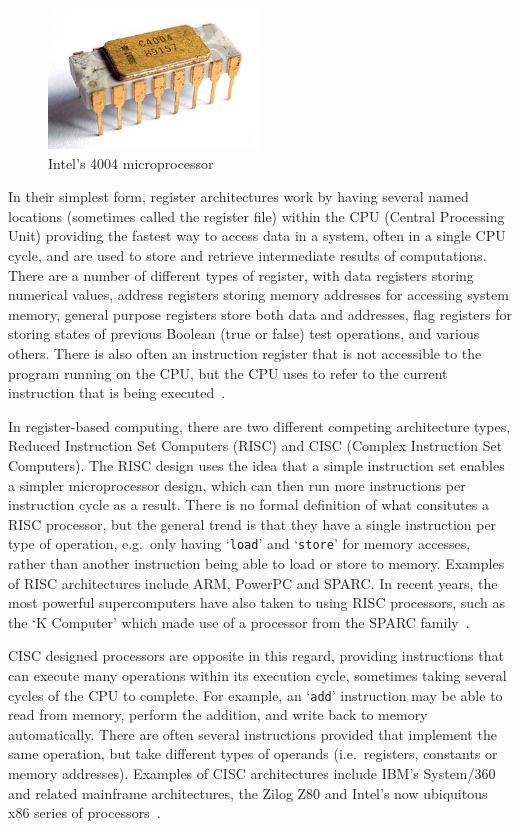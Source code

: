 \begin{figure}
  \includegraphics[width=0.5\textwidth]{imgs/Intel_C4004}
  \caption{Intel's 4004 microprocessor}\label{fig:4004}
\end{figure}

In their simplest form, register architectures work by having several named
locations (sometimes called the register file) within the CPU (Central
Processing Unit) providing the fastest way to access data in a system, often in
a single CPU cycle, and are used to store and retrieve intermediate results of
computations. There are a number of different types of register, with data
registers storing numerical values, address registers storing memory addresses
for accessing system memory, general purpose registers store both data and
addresses, flag registers for storing states of previous Boolean (true or false)
test operations, and various others. There is also often an instruction
register that is not accessible to the program running on the CPU, but the CPU
uses to refer to the current instruction that is being
executed~\cite{Mittal2016RegisterFile}\cite{Patterson2011Computer}.

In register-based computing, there are two different competing architecture
types, Reduced Instruction Set Computers (RISC) and CISC (Complex Instruction
Set Computers). The RISC design uses the idea that a simple instruction set
enables a simpler microprocessor design, which can then run more instructions
per instruction cycle as a result. There is no formal definition of what
consitutes a RISC processor, but the general trend is that they have a single
instruction per type of operation, e.g.\ only having `\texttt{load}' and
`\texttt{store}' for memory accesses, rather than another instruction being able
to load or store to memory. Examples of RISC architectures include ARM, PowerPC
and SPARC\@. In recent years, the most powerful supercomputers have also taken
to using RISC processors, such as the `K Computer' which made use of a
processor from the SPARC family~\cite{Yokokawa2011KCJ}.

CISC designed processors are opposite in this regard, providing instructions
that can execute many operations within its execution cycle, sometimes taking
several cycles of the CPU to complete. For example, an `\texttt{add}'
instruction may be able to read from memory, perform the addition, and write
back to memory automatically. There are often several instructions provided that
implement the same operation, but take different types of operands (i.e.\
registers, constants or memory addresses). Examples of CISC architectures
include IBM's System/360 and related mainframe architectures, the Zilog Z80 and
Intel's now ubiquitous x86 series of processors~\cite{Patterson1980CRI}.

